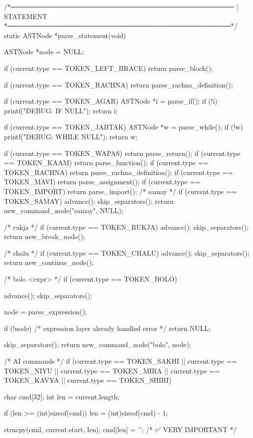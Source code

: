 \documentclass{article}
\begin{document}
/*──────────────────────────────────────────────
  | STATEMENT
  *──────────────────────────────────────────────*/
static ASTNode *parse_statement(void)
{
    ASTNode *node = NULL;

    if (current.type == TOKEN_LEFT_BRACE) return parse_block();

     if (current.type == TOKEN_RACHNA)
    return parse_rachna_definition();

    if (current.type == TOKEN_AGAR) {
        ASTNode *i = parse_if();
        if (!i) printf("DEBUG: IF NULL\n");
        return i;
    }

    if (current.type == TOKEN_JABTAK) {
        ASTNode *w = parse_while();
        if (!w) printf("DEBUG: WHILE NULL\n");
        return w;
    }

    if (current.type == TOKEN_WAPAS)      return parse_return();
    if (current.type == TOKEN_KAAM)       return parse_function();
    if (current.type == TOKEN_RACHNA)    return parse_rachna_definition();
    if (current.type == TOKEN_MAVI)       return parse_assignment();
    if (current.type == TOKEN_IMPORT)     return parse_import();
    /* samay */
    if (current.type == TOKEN_SAMAY) {
        advance();
        skip_separators();
        return new_command_node("samay", NULL);
    }

    /* rukja */
    if (current.type == TOKEN_RUKJA) {
        advance();
        skip_separators();
        return new_break_node();
    }

    /* chalu */
    if (current.type == TOKEN_CHALU) {
        advance();
        skip_separators();
        return new_continue_node();
    }

/* bolo <expr> */
if (current.type == TOKEN_BOLO) {
    advance();
    skip_separators();

    node = parse_expression();

    if (!node) {
        /* expression layer already handled error */
        return NULL;
    }

    skip_separators();
    return new_command_node("bolo", node);
}

/* AI commands */
if (current.type == TOKEN_SAKHI ||
    current.type == TOKEN_NIYU  ||
    current.type == TOKEN_MIRA  ||
    current.type == TOKEN_KAVYA ||
    current.type == TOKEN_SHIRI) {

    char cmd[32];
    int len = current.length;

    if (len >= (int)sizeof(cmd))
        len = (int)sizeof(cmd) - 1;

    strncpy(cmd, current.start, len);
    cmd[len] = '\0';   /* ✅ VERY IMPORTANT */

}}
\end{document}
